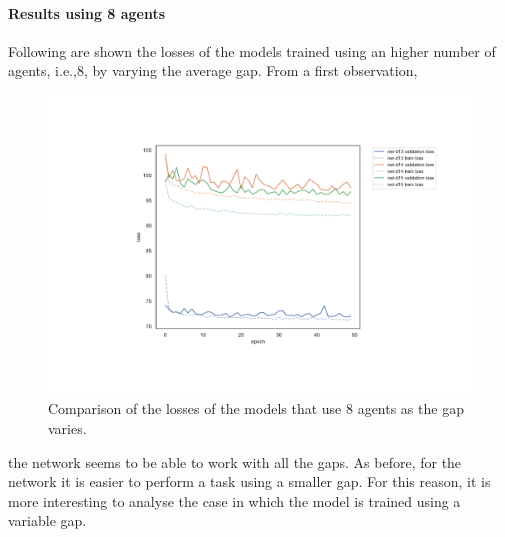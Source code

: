 \paragraph*{Results using 8 agents}
Following are shown the losses of the models trained using an higher number of 
agents, i.e.,8, by varying the average gap. From a first observation, 
\begin{figure}[H]
	\centering
	\includegraphics[width=.75\textwidth]{contents/images/task1-extension/loss-distributed-n8@}%
	\caption[Comparison of the losses of the models that use $8$ 
	agents.]{Comparison of the losses of the models that use $8$ agents as the gap 
	varies.}
	\label{fig:distlossn8}
\end{figure}

\noindent
the network seems to be able to work with all the gaps.
As before, for the network it is easier to perform a task using a smaller gap.
For this reason, it is more interesting to analyse the case in which the model 
is trained using a variable gap.

